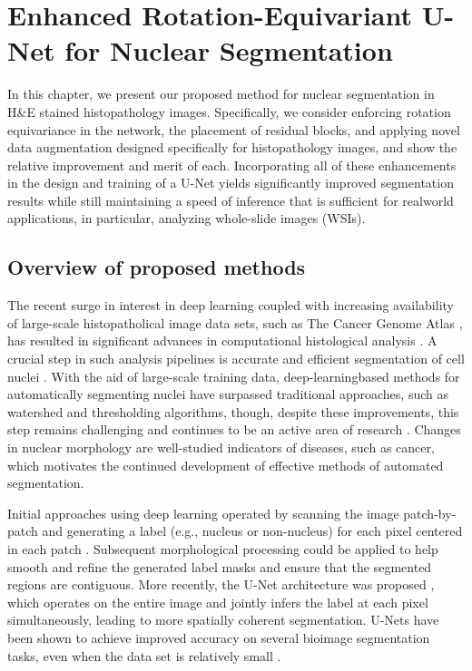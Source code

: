 \chapter{Enhanced Rotation-Equivariant U-Net for Nuclear Segmentation}
\label{chap-method}
\begin{ChapAbstract}
In this chapter, we present our proposed method for nuclear segmentation in H\&E stained histopathology images. Specifically, we consider enforcing rotation equivariance in the network, the placement of residual blocks, and applying novel data augmentation designed specifically for histopathology images, and show the relative improvement and merit of each. Incorporating all of these enhancements in the design and training of a U-Net yields significantly improved segmentation results while still maintaining a speed of inference that is sufficient for realworld applications, in particular, analyzing whole-slide images (WSIs).  
\end{ChapAbstract}

\section{Overview of proposed methods}
The recent surge in interest in deep learning coupled with increasing availability of large-scale histopatholical image data sets, such as The Cancer Genome Atlas \cite{tcga}, has resulted in significant advances in computational histological analysis \cite{he_dataset_kumar, unet}. A crucial step in such analysis pipelines is accurate and efficient segmentation of cell nuclei \cite{review_seg_overall}. With the aid of large-scale training data, deep-learningbased methods for automatically segmenting nuclei have surpassed traditional approaches, such as watershed \cite{watershed}
and thresholding \cite{Otsu} algorithms, though, despite these improvements, this step remains challenging and continues to be an active area of research \cite{review_seg_overall}. Changes in nuclear morphology are well-studied indicators of diseases, such as cancer, which motivates the continued development of effective methods of automated segmentation.

Initial approaches using deep learning operated by scanning the image patch-by-patch and generating a label (e.g., nucleus or non-nucleus) for each pixel centered in each patch \cite{he_dataset_kumar}. Subsequent morphological processing could be applied to help smooth and refine the generated label masks and ensure that the segmented regions are contiguous. More recently, the U-Net architecture was proposed \cite{unet}, which operates on the entire image and jointly infers the label at each pixel simultaneously, leading to more spatially coherent segmentation. U-Nets have been shown to achieve improved accuracy on several bioimage segmentation tasks, even when the data set is relatively small \cite{unet}.

